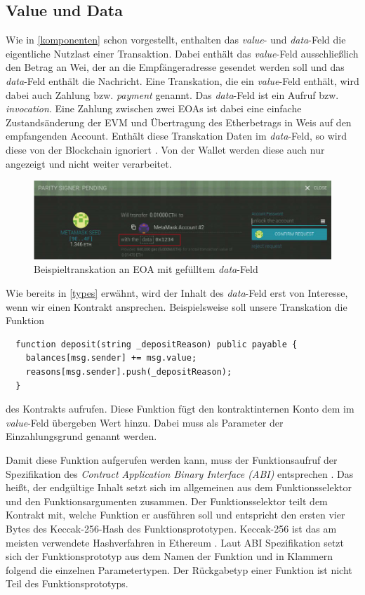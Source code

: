 \documentclass[runningheads]{llncs}
\begin{document}
\subsection{Value und Data}
\label{valData}
Wie in \ref{komponenten} schon vorgestellt, enthalten das \textit{value}- und \textit{data}-Feld die eigentliche Nutzlast einer Transaktion. Dabei enthält das \textit{value}-Feld ausschließlich den Betrag an Wei, der an die Empfängeradresse gesendet werden soll und das \textit{data}-Feld enthält die Nachricht.
Eine Transkation, die ein \textit{value}-Feld enthält, wird dabei auch Zahlung bzw. \textit{payment} genannt. Das \textit{data}-Feld ist ein Aufruf bzw. \textit{invocation}\cite[S.108]{antonopoulos_mastering_2019}. Eine Zahlung zwischen zwei EOAs ist dabei eine einfache Zustandsänderung der EVM und Übertragung des Etherbetrags in Weis auf den empfangenden Account. Enthält diese Transkation Daten im \textit{data}-Feld, so wird diese von der Blockchain ignoriert \cite[S.10]{wood_ethereum/yellowpaper_2019}. Von der Wallet werden diese auch nur angezeigt und nicht weiter verarbeitet.
\begin{figure}[h!]
  \includegraphics[width=\textwidth, keepaspectratio]{dataTransaction.png}
  \caption{Beispieltranskation an EOA mit gefülltem \textit{data}-Feld \cite[S.109]{antonopoulos_mastering_2019}}
\end{figure}

Wie bereits in \ref{types} erwähnt, wird der Inhalt des \textit{data}-Feld erst von Interesse, wenn wir einen Kontrakt ansprechen.
Beispielsweise soll unsere Transkation die Funktion \\
\begin{verbatim}
  function deposit(string _depositReason) public payable {
    balances[msg.sender] += msg.value;
    reasons[msg.sender].push(_depositReason);
  }
\end{verbatim}
des Kontrakts aufrufen. Diese Funktion fügt den kontraktinternen Konto dem im \textit{value}-Feld übergeben Wert hinzu. Dabei muss als Parameter der Einzahlungsgrund genannt werden.

Damit diese Funktion aufgerufen werden kann, muss der Funktionsaufruf der Spezifikation des \textit{Contract Application Binary Interface (ABI)} entsprechen \cite{noauthor_contract_nodate}.
Das heißt, der endgültige Inhalt setzt sich im allgemeinen aus dem Funktionsselektor und den Funktionsargumenten zusammen. Der Funktionsselektor teilt dem Kontrakt mit, welche Funktion er ausführen soll und entspricht den ersten vier Bytes des Keccak-256-Hash des Funktionsprototypen. Keccak-256 ist das am meisten verwendete Hashverfahren in Ethereum \cite[S. 3]{wood_ethereum/yellowpaper_2019}. Laut ABI Spezifikation setzt sich der Funktionsprototyp aus dem Namen der Funktion und in Klammern folgend die einzelnen Parametertypen. Der Rückgabetyp einer Funktion ist nicht Teil des Funktionsprototyps.
\end{document}
